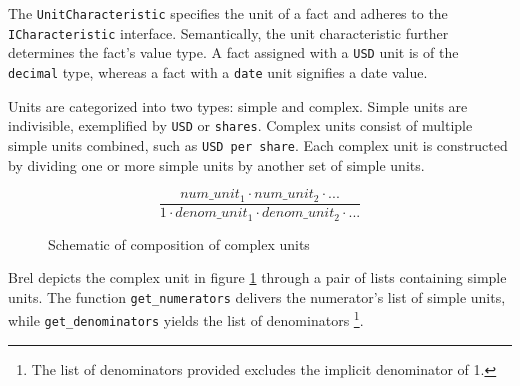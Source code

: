 
The \texttt{UnitCharacteristic} specifies the unit of a fact and adheres to the \texttt{ICharacteristic} interface.
Semantically, the unit characteristic further determines the fact's value type.
A fact assigned with a \texttt{USD} unit is of the \texttt{decimal} type, whereas a fact with a \texttt{date} unit signifies a date value.

Units are categorized into two types: simple and complex.
Simple units are indivisible, exemplified by \texttt{USD} or \texttt{shares}.
Complex units consist of multiple simple units combined, such as \texttt{USD per share}.
Each complex unit is constructed by dividing one or more simple units by another set of simple units.

\begin{figure}[H]
    \centering
    \caption{Schematic of composition of complex units}
    $$\frac{num\_unit_1 \cdot num\_unit_2 \cdot ...}{1 \cdot denom\_unit_1 \cdot denom\_unit_2 \cdot ...}$$
    \label{fig:complex_unit}
\end{figure}

Brel depicts the complex unit in figure \ref{fig:complex_unit} through a pair of lists containing simple units.
The function \texttt{get\_numerators} delivers the numerator's list of simple units, while \texttt{get\_denominators} yields the list of denominators
\footnote{The list of denominators provided excludes the implicit denominator of 1.}.

